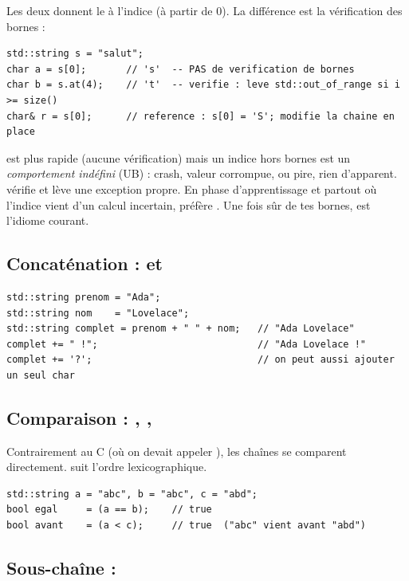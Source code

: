 \documentclass[11pt]{article}
\begin{document}
Les deux donnent le  à l'indice  (à partir de 0). La
différence est la vérification des bornes :

\begin{lstlisting}
std::string s = "salut";
char a = s[0];       // 's'  -- PAS de verification de bornes
char b = s.at(4);    // 't'  -- verifie : leve std::out_of_range si i >= size()
char& r = s[0];      // reference : s[0] = 'S'; modifie la chaine en place
\end{lstlisting}

\begin{aretenir}
\code{[]} est plus rapide (aucune vérification) mais un indice hors bornes est
un \emph{comportement indéfini} (UB) : crash, valeur corrompue, ou pire, rien
d'apparent.  vérifie et lève une exception propre. En phase
d'apprentissage et partout où l'indice vient d'un calcul incertain, préfère
. Une fois sûr de tes bornes, \code{[]} est l'idiome courant.
\end{aretenir}

\subsection*{Concaténation : \code{+} et \code{+=}}

\begin{lstlisting}
std::string prenom = "Ada";
std::string nom    = "Lovelace";
std::string complet = prenom + " " + nom;   // "Ada Lovelace"
complet += " !";                            // "Ada Lovelace !"
complet += '?';                             // on peut aussi ajouter un seul char
\end{lstlisting}

\subsection*{Comparaison : \code{==}, \code{!=}, \code{<}}

Contrairement au C (où on devait appeler ), les chaînes se
comparent directement. \code{<} suit l'ordre lexicographique.

\begin{lstlisting}
std::string a = "abc", b = "abc", c = "abd";
bool egal     = (a == b);    // true
bool avant    = (a < c);     // true  ("abc" vient avant "abd")
\end{lstlisting}

\subsection*{Sous-chaîne : }
\end{document}
